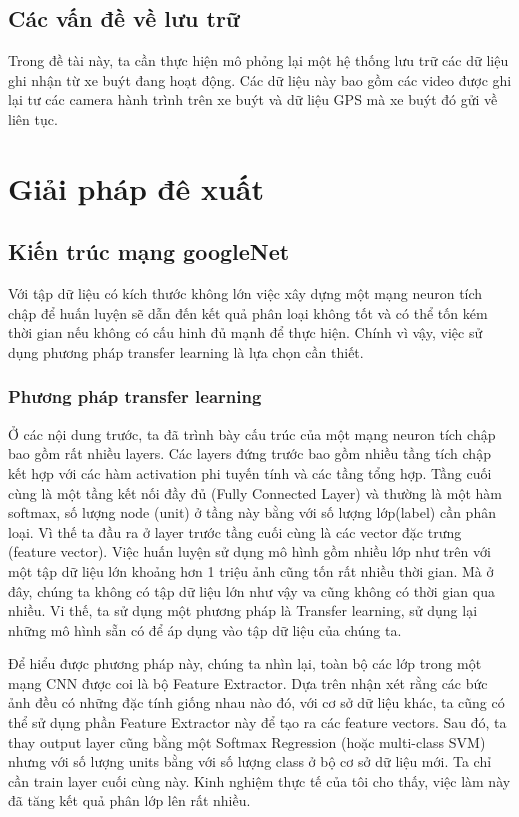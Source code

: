 	\subsection{Các vấn đề về lưu trữ}
	Trong đề tài này, ta cần thực hiện mô phỏng lại một hệ thống lưu trữ các dữ liệu ghi nhận từ xe buýt đang hoạt động. Các dữ liệu này bao gồm các video được ghi lại tư các camera hành trình trên xe buýt và dữ liệu GPS mà xe buýt đó gửi về liên tục.\par 	

\section{Giải pháp đê xuất}
	\subsection{Kiến trúc mạng googleNet}
	Với tập dữ liệu có kích thước không lớn việc xây dựng một mạng neuron tích chập để huấn luyện sẽ dẫn đến kết quả phân loại không tốt và có thể tốn kém thời gian nếu không có cấu hinh đủ mạnh để thực hiện. Chính vì vậy, việc sử dụng phương pháp transfer learning là lựa chọn cần thiết.
	\subsubsection{Phương pháp transfer learning}
	Ở các nội dung trước, ta đã trình bày cấu trúc của một mạng neuron tích chập bao gồm rất nhiều layers. Các layers đứng trước bao gồm nhiều tầng tích chập kết hợp với các hàm activation phi tuyến tính và các tầng tổng hợp. Tầng cuối cùng là một tầng kết nối đầy đủ (Fully Connected Layer) và thường là một hàm softmax, số lượng node (unit) ở tầng này bằng với số lượng lớp(label) cần phân loại. Vì thế ta đầu ra ở layer trước tầng cuối cùng là các vector đặc trưng (feature vector). Việc huấn luyện sử dụng mô hình gồm nhiều lớp như trên với một tập dữ liệu lớn khoảng hơn 1 triệu ảnh cũng tốn rất nhiều thời gian. Mà ở đây, chúng ta không có tập dữ liệu lớn như vậy va cũng không có thời gian qua nhiều. Vi thế, ta sử dụng một phương pháp là Transfer learning, sử dụng lại những mô hình sẵn có để áp dụng vào tập dữ liệu của chúng ta.\par 
	Để hiểu được phương pháp này, chúng ta nhìn lại, toàn bộ các lớp trong một mạng CNN được coi là bộ Feature Extractor. Dựa trên nhận xét rằng các bức ảnh đều có những đặc tính giống nhau nào đó, với cơ sở dữ liệu khác, ta cũng có thể sử dụng phần Feature Extractor này để tạo ra các feature vectors. Sau đó, ta thay output layer cũng bằng một Softmax Regression (hoặc multi-class SVM) nhưng với số lượng units bằng với số lượng class ở bộ cơ sở dữ liệu mới. Ta chỉ cần train layer cuối cùng này. Kinh nghiệm thực tế của tôi cho thấy, việc làm này đã tăng kết quả phân lớp lên rất nhiều.
		
